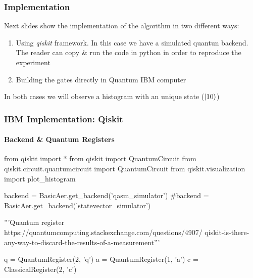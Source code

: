 \begin{frame}
	\frametitle{Implementation}

	Next slides show the implementation of the algorithm in two different ways:
	\begin{enumerate}
		\item Using \textit{qiskit} framework. In this case we have a simulated quantun backend. The reader can copy \& run the code in python in order to reproduce the experiment
		\item Building the gates directly in Quantum IBM computer
	\end{enumerate}
\begin{block}{}
	\begin{center}
		In both cases we will observe a histogram with an unique state ($\ket{10}$)
	\end{center}
\end{block}
\end{frame}

\begin{frame}[fragile]{}
	\frametitle{IBM Implementation: Qiskit}
	\framesubtitle{Backend \& Quantum Registers}
	\vspace*{0.5cm}
		\begin{adjustbox}{max width=0.8\textwidth}
			\begin{python}
				
from qiskit import *
from qiskit import QuantumCircuit
from qiskit.circuit.quantumcircuit import QuantumCircuit
from qiskit.visualization import plot_histogram

backend = BasicAer.get_backend('qasm_simulator')
#backend = BasicAer.get_backend('statevector_simulator')

'''Quantum register
https://quantumcomputing.stackexchange.com/questions/4907/
qiskit-is-there-any-way-to-discard-the-results-of-a-measurement'''

q = QuantumRegister(2, 'q')
a = QuantumRegister(1, 'a')
c = ClassicalRegister(2, 'c')
			\end{python}
		\end{adjustbox}

\end{frame}

